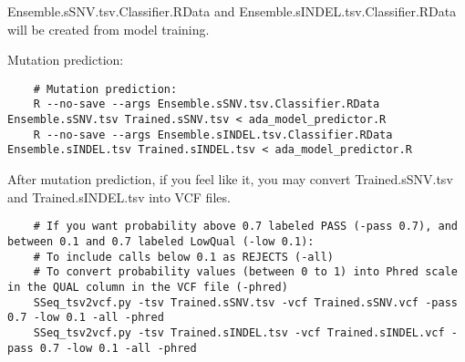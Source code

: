 \documentclass[10pt,letterpaper]{article}
\begin{document}
	Ensemble.sSNV.tsv.Classifier.RData and Ensemble.sINDEL.tsv.Classifier.RData will be created from model training.
	

	Mutation prediction:
	
	\begin{lstlisting}
	# Mutation prediction:
	R --no-save --args Ensemble.sSNV.tsv.Classifier.RData Ensemble.sSNV.tsv Trained.sSNV.tsv < ada_model_predictor.R
	R --no-save --args Ensemble.sINDEL.tsv.Classifier.RData Ensemble.sINDEL.tsv Trained.sINDEL.tsv < ada_model_predictor.R
	\end{lstlisting}

	
	After mutation prediction, if you feel like it, you may convert Trained.sSNV.tsv and Trained.sINDEL.tsv into VCF files. 

	\begin{lstlisting}
	# If you want probability above 0.7 labeled PASS (-pass 0.7), and between 0.1 and 0.7 labeled LowQual (-low 0.1):
	# To include calls below 0.1 as REJECTS (-all)
	# To convert probability values (between 0 to 1) into Phred scale in the QUAL column in the VCF file (-phred)
	SSeq_tsv2vcf.py -tsv Trained.sSNV.tsv -vcf Trained.sSNV.vcf -pass 0.7 -low 0.1 -all -phred
	SSeq_tsv2vcf.py -tsv Trained.sINDEL.tsv -vcf Trained.sINDEL.vcf -pass 0.7 -low 0.1 -all -phred
	\end{lstlisting}
\end{document}
